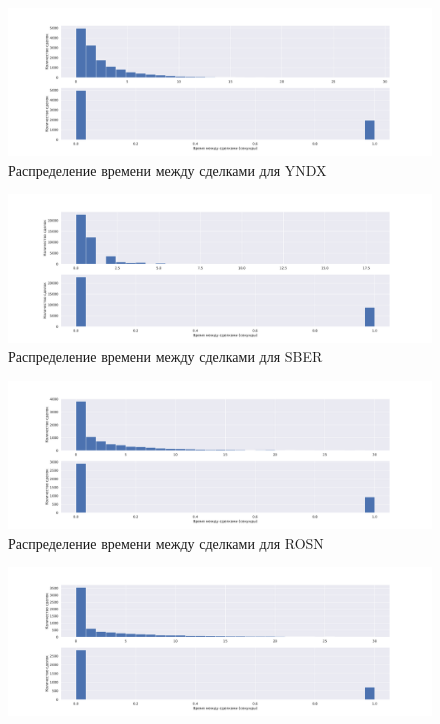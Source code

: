 \begin{appendices}
        \begin{figure}
                \includegraphics[scale=0.35]{fig/timedistr/SE/YNDX.pdf}
                \caption{Распределение времени между сделками для YNDX}
                \label{appstart}
        \end{figure}
        \begin{figure}
                \includegraphics[scale=0.35]{fig/timedistr/SE/SBER.pdf}
                \caption{Распределение времени между сделками для SBER}
                \label{app}
        \end{figure}
        \begin{figure}
            \includegraphics[scale=0.35]{fig/timedistr/SE/ROSN.pdf}
            \caption{Распределение времени между сделками для ROSN}
            \label{app}
        \end{figure}
        \begin{figure}
                \includegraphics[scale=0.35]{fig/timedistr/SE/PLZL.pdf}

\end{figure}
\end{appendices}
